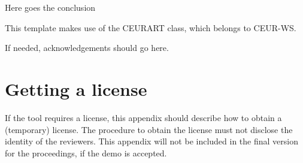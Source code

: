 \documentclass[
]{ceurart}
\begin{document}
Here goes the conclusion

\begin{acknowledgments}
This template makes use of the CEURART class, which belongs to CEUR-WS.

If needed, acknowledgements should go here. 
\end{acknowledgments}



\appendix

\section{Getting a license}
If the tool requires a license, this appendix should describe how to obtain a (temporary) license. The procedure to obtain the license must not disclose the identity of the reviewers. This appendix will not be included in the final version for the proceedings, if the demo is accepted.
\end{document}
